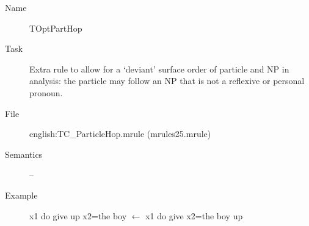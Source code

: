 \begin{description}
\vspace{1 cm}
\begin{description}
\item[Name] TOptPartHop
\item[Task] Extra rule to allow for a `deviant' surface order of particle and 
NP in analysis: the particle may follow an NP that is not a reflexive or 
personal pronoun.
\item[File] english:TC\_ParticleHop.mrule (mrules25.mrule)
\item[Semantics] -- 
\item[Example] x1 do give up x2=the boy $\leftarrow$ x1 do give x2=the boy up
\end{description}

\end{description}


